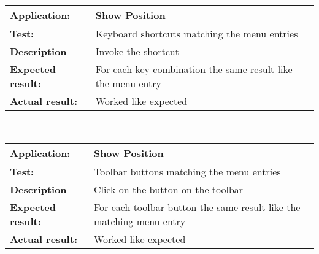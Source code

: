    \begin{tabular}{|p{3.5cm}|p{10.5cm}|}
    \hline
     \textbf{Application:}	& Show Position\\
    \hline
     \textbf{Test:}		& Keyboard shortcuts matching the menu entries\\
    \hline
     \textbf{Description}	& Invoke the shortcut\\
    \hline
     \textbf{Expected result:}	& For each key combination the same result like the menu entry\\
    \hline
     \textbf{Actual result:}	& Worked like expected\\
    \hline
   \end{tabular}\\
   \begin{tabular}{|p{3.5cm}|p{10.5cm}|}
    \hline
     \textbf{Application:}	& Show Position\\
    \hline
     \textbf{Test:}		& Toolbar buttons matching the menu entries\\
    \hline
     \textbf{Description}	& Click on the button on the toolbar\\
    \hline
     \textbf{Expected result:}	& For each toolbar button the same result like the matching menu entry\\
    \hline
     \textbf{Actual result:}	& Worked like expected\\
    \hline
   \end{tabular}

